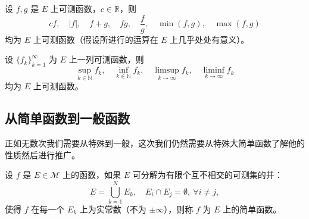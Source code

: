 \documentclass[lang=cn,10pt]{elegantbook}
\let\oldliminf\liminf
\renewcommand{\liminf}{\mathop{\oldliminf}\limits}
\let\oldlimsup\limsup
\renewcommand{\limsup}{\mathop{\oldlimsup}\limits}
\begin{document}
\begin{theorem}[函数可测性对算术运算的封闭性]
设 $f, g$ 是 $E$ 上可测函数，$c \in \mathbb{R}$，则
\[
cf,\quad |f|,\quad f + g,\quad fg,\quad \frac{f}{g},\quad \min(f, g),\quad \max(f, g)
\]
均为 $E$ 上可测函数（假设所进行的运算在 $E$ 上几乎处处有意义）。
\end{theorem}
\begin{theorem}[函数可测性对极限运算的封闭性]
设 $\{f_k\}_{k=1}^\infty$ 为 $E$ 上一列可测函数，则
\[
\sup_{k \in \mathbb{N}} f_k,\quad \inf_{k \in \mathbb{N}} f_k,\quad \limsup_{k \to \infty} f_k,\quad \liminf_{k \to \infty} f_k
\]
均为 $E$ 上可测函数。
\end{theorem}
\subsection{从简单函数到一般函数}
正如无数次我们需要从特殊到一般，这次我们仍然需要从特殊大简单函数了解他的性质然后进行推广。
\begin{definition}[简单函数]
设 $f$ 是 $E \in \mathcal{M}$ 上的函数，如果 $E$ 可分解为有限个互不相交的可测集的并：
\[
E = \bigcup_{k=1}^{N} E_k, \quad E_i \cap E_j = \emptyset, \ \forall i \ne j,
\]
使得 $f$ 在每一个 $E_k$ 上为实常数（不为 $\pm \infty$），则称 $f$ 为 $E$ 上的简单函数。
\end{definition}
\end{document}
